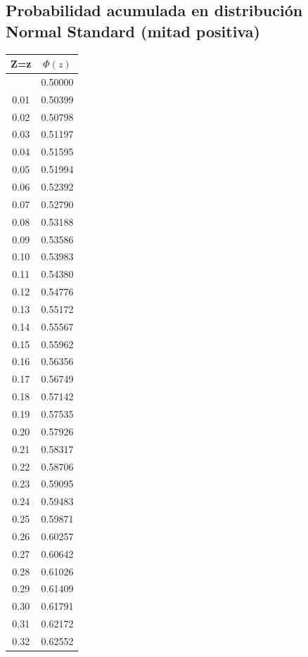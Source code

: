 \documentclass[
  letterpaper,
  DIV=11,
  numbers=noendperiod]{scrartcl}
\begin{document}
\newpage

\hypertarget{probabilidad-acumulada-en-distribuciuxf3n-normal-standard-mitad-positiva}{%
\subsection{Probabilidad acumulada en distribución Normal Standard
(mitad
positiva)}\label{probabilidad-acumulada-en-distribuciuxf3n-normal-standard-mitad-positiva}}

\begin{longtable}[]{@{}cc@{}}
\toprule\noalign{}
Z=z & \(\Phi(z)\) \\
\midrule\noalign{}
\endhead
\bottomrule\noalign{}
\endlastfoot
0.00 & 0.50000 \\
0.01 & 0.50399 \\
0.02 & 0.50798 \\
0.03 & 0.51197 \\
0.04 & 0.51595 \\
0.05 & 0.51994 \\
0.06 & 0.52392 \\
0.07 & 0.52790 \\
0.08 & 0.53188 \\
0.09 & 0.53586 \\
0.10 & 0.53983 \\
0.11 & 0.54380 \\
0.12 & 0.54776 \\
0.13 & 0.55172 \\
0.14 & 0.55567 \\
0.15 & 0.55962 \\
0.16 & 0.56356 \\
0.17 & 0.56749 \\
0.18 & 0.57142 \\
0.19 & 0.57535 \\
0.20 & 0.57926 \\
0.21 & 0.58317 \\
0.22 & 0.58706 \\
0.23 & 0.59095 \\
0.24 & 0.59483 \\
0.25 & 0.59871 \\
0.26 & 0.60257 \\
0.27 & 0.60642 \\
0.28 & 0.61026 \\
0.29 & 0.61409 \\
0.30 & 0.61791 \\
0.31 & 0.62172 \\
0.32 & 0.62552 \\

\end{longtable}
\end{document}

